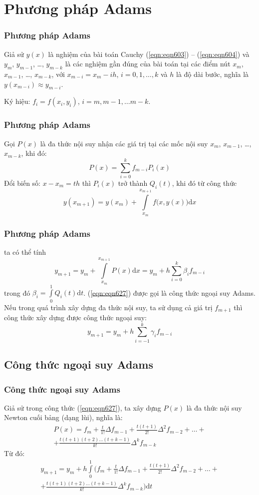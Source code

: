 \section{Phương pháp Adams}

\begin{frame}
	\frametitle{Phương pháp Adams}
	Giả sử $y(x)$ là nghiệm của bài toán Cauchy (\ref{eqn:eqn603}) – (\ref{eqn:eqn604}) và $y_m$, $y_{m-1}$, \ldots, $y_{m-k}$ là các nghiệm gần đúng của bài toán tại các điểm nút $x_m$, $x_{m-1}$, \ldots, $x_{m-k}$, với $x_{m-i}=x_m-ih$, $i=0,1,\ldots,k$ và $h$ là độ dài bước, nghĩa là $y(x_{m-i})\approx y_{m-i}$.\par
	Ký hiệu: $f_i=f(x_i,y_i)$, $i=m,m-1,\ldots m-k$.
\end{frame}

\begin{frame}
	\frametitle{Phương pháp Adams}
	Gọi $P(x)$ là đa thức nội suy nhận các giá trị tại các mốc nội suy $x_m$, $x_{m-1}$, \ldots, $x_{m-k}$, khi đó:
	$$P(x)=\sum\limits_{i=0}^{k}f_{m-i}P_{i}(x)$$
	Đổi biến số: $x-x_m=th$ thì $P_i(x)$ trở thành $Q_i(t)$, khi đó từ công thức
	$$y\left(x_{m+1}\right)= y(x_m) + \int\limits_{x_m}^{x_{m+1}} f\big(x, y(x)\big)\mathrm{d}x$$
\end{frame}

\begin{frame}
	\frametitle{Phương pháp Adams}
	ta có thể tính
	\begin{equation}\label{eqn:eqn627}
		y_{m+1}=y_m+\int\limits_{x_m}^{x_{m+1}} P(x)\mathrm{d}x=y_m+h\sum\limits_{i=0}^{k}\beta_i f_{m-i}
	\end{equation}
	trong đó $\beta_i=\int\limits_0^1Q_i(t)\mathrm{d}t$.
	(\ref{eqn:eqn627}) được gọi là công thức ngoại suy Adams. Nếu trong quá trình xây dựng đa thức nội suy, ta sử dụng cả giá trị $f_{m+1}$ thì công thức xây dựng được công thức ngoại suy:
	\begin{equation}\label{eqn:eqn628}
		y_{m+1}=y_m+h\sum\limits_{i=-1}^{k}\gamma_i f_{m-i}
	\end{equation}
\end{frame}

\begin{frame}
	\subsection{Công thức ngoại suy Adams}
	\frametitle{Công thức ngoại suy Adams}
	Giả sử trong công thức (\ref{eqn:eqn627}), ta xây dựng $P(x)$ là đa thức nội suy Newton cuối bảng (dạng lùi), nghĩa là:
	\begin{multline*}
		P(x)=f_m+\frac{t}{1!}\Delta f_{m-1}+\frac{t(t+1)}{2!}\Delta^2 f_{m-2}+\ldots+\\
		+\frac{t(t+1)(t+2)\ldots (t+k-1)}{k!}\Delta^k f_{m-k}
	\end{multline*}
	Từ đó:
	\begin{multline*}
		y_{m+1}=y_m+h\int\limits_{0}^{1} \bigg(f_m+\frac{t}{1!}\Delta f_{m-1}+\frac{t(t+1)}{2!}\Delta^2 f_{m-2}+\ldots+\\
		+\frac{t(t+1)(t+2)\ldots (t+k-1)}{k!}\Delta^k f_{m-k}\bigg)\mathrm{d}t
	\end{multline*}
	\end{frame}

